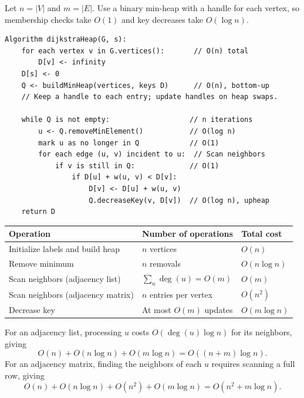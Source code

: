 \documentclass[11pt,letterpaper]{article}
\begin{document}
Let $n=|V|$ and $m=|E|$. Use a binary min-heap with a handle for each vertex, so membership checks take $O(1)$ and key decreases take $O(\log n)$.
\begin{lstlisting}[caption={Dijkstra's algorithm with binary-heap operation costs}]
Algorithm dijkstraHeap(G, s):
    for each vertex v in G.vertices():       // O(n) total
        D[v] <- infinity
    D[s] <- 0
    Q <- buildMinHeap(vertices, keys D)      // O(n), bottom-up
    // Keep a handle to each entry; update handles on heap swaps.

    while Q is not empty:                   // n iterations
        u <- Q.removeMinElement()           // O(log n)
        mark u as no longer in Q            // O(1)
        for each edge (u, v) incident to u:  // Scan neighbors
            if v is still in Q:             // O(1)
                if D[u] + w(u, v) < D[v]:
                    D[v] <- D[u] + w(u, v)
                    Q.decreaseKey(v, D[v])  // O(log n), upheap
    return D
\end{lstlisting}

\begin{center}
\begin{tabular}{@{}lll@{}}
\toprule
Operation & Number of operations & Total cost \\
\midrule
Initialize labels and build heap & $n$ vertices & $O(n)$ \\
Remove minimum & $n$ removals & $O(n\log n)$ \\
Scan neighbors (adjacency list) & $\sum_u \deg(u)=O(m)$ & $O(m)$ \\
Scan neighbors (adjacency matrix) & $n$ entries per vertex & $O(n^2)$ \\
Decrease key & At most $O(m)$ updates & $O(m\log n)$ \\
\bottomrule
\end{tabular}
\end{center}

For an adjacency list, processing $u$ costs $O(\deg(u)\log n)$ for its neighbors, giving
\[
    O(n)+O(n\log n)+O(m\log n)
    = \boxed{O((n+m)\log n)}.
\]
For an adjacency matrix, finding the neighbors of each $u$ requires scanning a full row, giving
\[
    O(n)+O(n\log n)+O(n^2)+O(m\log n)
    = \boxed{O(n^2+m\log n)}.
\]
\end{document}
